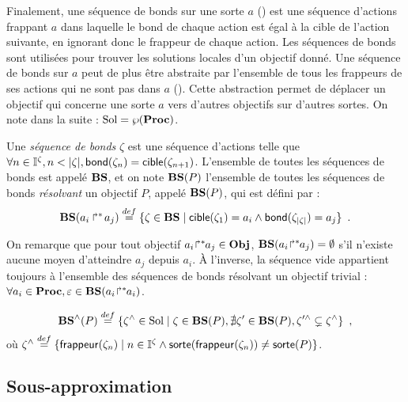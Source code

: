 Finalement, une séquence de bonds sur une sorte $a$ () est une séquence d'actions
frappant $a$ dans laquelle le bond de chaque action est égal à la cible de l'action suivante,
en ignorant donc le frappeur de chaque action.
Les séquences de bonds sont utilisées pour trouver les solutions locales d'un objectif donné.
Une séquence de bonds sur $a$ peut de plus être abstraite par l'ensemble de tous les frappeurs
de ses actions qui ne sont pas dans $a$ ().
Cette abstraction permet de déplacer un objectif qui concerne une sorte $a$
vers d'autres objectifs sur d'autres sortes.
On note dans la suite : $\mathrm{Sol} = \wp(\mathbf{Proc})$.

\begin{definition}
  Une \emph{séquence de bonds} $\zeta$ est une séquence d'actions telle que
  $\forall n \in \mathbb{I}^{\zeta}, n < |\zeta|, \mathsf{bond}(\zeta_{n}) = \mathsf{cible}(\zeta_{n+1})$.
  L'ensemble de toutes les séquences de bonds est appelé $\mathbf{BS}$,
  et on note $\mathbf{BS}(P)$ l'ensemble de toutes les séquences de bonds \emph{résolvant}
  un objectif $P$, appelé $\mathbf{BS}(P)$, qui est défini par :
    \[ \mathbf{BS}(\mbox{$a_i\Rsh^*\!a_j$}) \stackrel{def}= \{ \zeta \in \mathbf{BS} \mid
      \mathsf{cible}(\zeta_1) = a_i \wedge \mathsf{bond}(\zeta_{|\zeta|}) = a_j \} \enspace. \]
\end{definition}

\noindent
On remarque que pour tout objectif ${a_i\!\Rsh^*\!\!a_j} \in \mathbf{Obj}$,
$\mathbf{BS}({a_i\!\Rsh^*\!\!a_j}) = \emptyset$ s'il n'existe aucune moyen d'atteindre $a_j$ depuis $a_i$.
À l'inverse, la séquence vide appartient toujours à
l'ensemble des séquences de bonds résolvant un objectif trivial :
$\forall a_i \in \mathbf{Proc}, \varepsilon \in \mathbf{BS}({a_i\!\Rsh^*\!\!a_i})$.

\begin{definition}
  \[
    \mathbf{BS}^\wedge(P) \stackrel{def}= \{ \zeta^\wedge \in \mathrm{Sol} \mid \zeta \in \mathbf{BS}(P), \nexists \zeta' \in \mathbf{BS}(P), \zeta'^\wedge \subsetneq \zeta^\wedge \} \enspace,
  \]
  où $\zeta^\wedge \stackrel{def}= \{ \mathsf{frappeur}(\zeta_n) \mid  n \in \mathbb{I}^{\zeta} \wedge \mathsf{sorte}(\mathsf{frappeur}(\zeta_n)) \neq \mathsf{sorte}(P) \}$.
\end{definition}



\subsection{Sous-approximation}

